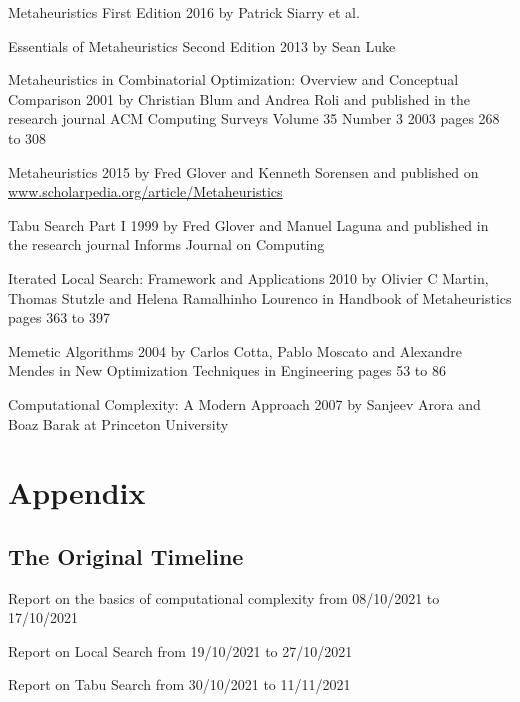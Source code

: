 \documentclass[]{final_report}
\begin{document}
\newpage
\begin{thebibliography}{99}
	
 Metaheuristics First Edition 2016 by Patrick Siarry et al.
	
 Essentials of Metaheuristics Second Edition 2013 by Sean Luke
	
 Metaheuristics in Combinatorial Optimization: Overview and Conceptual Comparison 2001 by Christian Blum and Andrea Roli and published in the research journal ACM Computing Surveys Volume 35 Number 3 2003 pages 268 to 308
	
 Metaheuristics 2015 by Fred Glover and Kenneth Sorensen and published on \url{www.scholarpedia.org/article/Metaheuristics}
	
 Tabu Search Part I 1999 by Fred Glover and Manuel Laguna and published in the research journal Informs Journal on Computing
	
 Iterated Local Search: Framework and Applications 2010 by Olivier C Martin, Thomas Stutzle and Helena Ramalhinho Lourenco in Handbook of Metaheuristics pages 363 to 397
	
 Memetic Algorithms 2004 by Carlos Cotta, Pablo Moscato and Alexandre Mendes in New Optimization Techniques in Engineering pages 53 to 86
	
 Computational Complexity: A Modern Approach 2007 by Sanjeev Arora and Boaz Barak at Princeton University
	
\end{thebibliography}

\chapter*{Appendix}

\section*{The Original Timeline}

Report on the basics of computational complexity from 08/10/2021 to 17/10/2021

Report on Local Search from 19/10/2021 to 27/10/2021

Report on Tabu Search from 30/10/2021 to 11/11/2021
\end{document}
